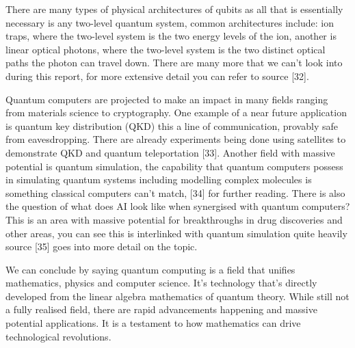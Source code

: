 \noindent There are many types of physical architectures of qubits as all that is essentially necessary is any two-level quantum system, common architectures include: ion traps, where the two-level system is the two energy levels of the ion, another is linear optical photons, where the two-level system is the two distinct optical
paths the photon can travel down. There are many more that we can't look into during this report, for more extensive detail you can refer to source [32].

\noindent Quantum computers are projected to make an impact in many fields ranging from materials science to cryptography. One example of a near future application is quantum key distribution (QKD) this a line of communication, provably safe from eavesdropping. There are already experiments being done using satellites to demonstrate QKD and quantum teleportation [33]. Another field with massive potential is quantum simulation, the capability that quantum computers possess in simulating quantum systems including modelling complex molecules is something classical computers can't match, [34] for further reading. There is also the question of what does AI look like when synergised with quantum computers? This is an area with massive potential for breakthroughs in drug discoveries and other areas, you can see this is interlinked with quantum simulation quite heavily source [35] goes into more detail on the topic.

\noindent We can conclude by saying quantum computing is a field that unifies mathematics, physics and computer science. It's technology that's directly developed from the linear algebra mathematics of quantum theory. While still not a fully realised field, there are rapid advancements happening and massive potential applications. It is a testament to how mathematics can drive technological revolutions.


